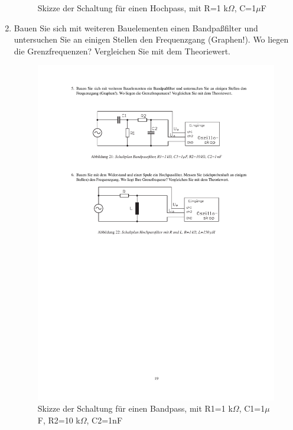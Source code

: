 \documentclass[12pt]{scrartcl}
\begin{document}
\begin{enumerate}
\begin{figure}[htbp]
  	\caption[Skizze der Schaltung für einen Hockpass, mit R=1 k$\Omega$, C=1$\mu$F]{Skizze der Schaltung für einen Hochpass, mit R=1 k$\Omega$, C=1$\mu$F\footnotemark}
  \label{fig:Hochpass}
\end{figure}
\item
Bauen Sie sich mit weiteren Bauelementen einen Bandpaßfilter und untersuchen Sie an einigen Stellen den Frequenzgang (Graphen!). Wo liegen die Grenzfrequenzen? Vergleichen Sie mit dem Theoriewert.
\begin{figure}[htbp] 
  \centering
    \includegraphics[trim = 20mm 220mm 1mm 30mm, clip, scale = 1]{bandpass_hochpass.pdf}
  	\caption[Skizze der Schaltung für einen Bandpass, mit R1=1 k$\Omega$, C1=1$\mu$F, R2=10 k$\Omega$, C2=1nF]{Skizze der Schaltung für einen Bandpass, mit R1=1 k$\Omega$, C1=1$\mu$F, R2=10 k$\Omega$, C2=1nF\footnotemark}

\end{figure}
\end{enumerate}
\end{document}
